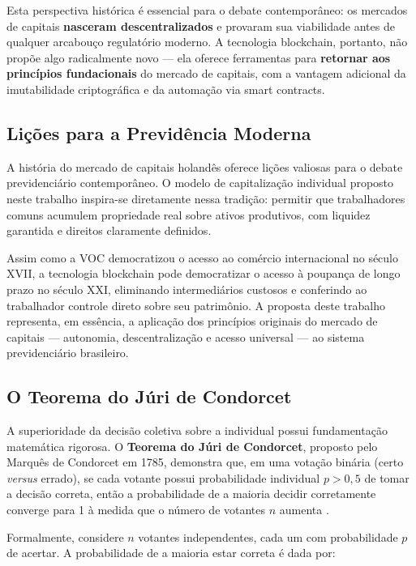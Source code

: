 Esta perspectiva histórica é essencial para o debate contemporâneo: os mercados de capitais \textbf{nasceram descentralizados} e provaram sua viabilidade antes de qualquer arcabouço regulatório moderno. A tecnologia blockchain, portanto, não propõe algo radicalmente novo --- ela oferece ferramentas para \textbf{retornar aos princípios fundacionais} do mercado de capitais, com a vantagem adicional da imutabilidade criptográfica e da automação via smart contracts.

\subsection{Lições para a Previdência Moderna}

A história do mercado de capitais holandês oferece lições valiosas para o debate previdenciário contemporâneo. O modelo de capitalização individual proposto neste trabalho inspira-se diretamente nessa tradição: permitir que trabalhadores comuns acumulem propriedade real sobre ativos produtivos, com liquidez garantida e direitos claramente definidos.

Assim como a VOC democratizou o acesso ao comércio internacional no século XVII, a tecnologia blockchain pode democratizar o acesso à poupança de longo prazo no século XXI, eliminando intermediários custosos e conferindo ao trabalhador controle direto sobre seu patrimônio. A proposta deste trabalho representa, em essência, a aplicação dos princípios originais do mercado de capitais --- autonomia, descentralização e acesso universal --- ao sistema previdenciário brasileiro.

\subsection{O Teorema do Júri de Condorcet}

A superioridade da decisão coletiva sobre a individual possui fundamentação matemática rigorosa. O \textbf{Teorema do Júri de Condorcet}, proposto pelo Marquês de Condorcet em 1785, demonstra que, em uma votação binária (certo \textit{versus} errado), se cada votante possui probabilidade individual $p > 0{,}5$ de tomar a decisão correta, então a probabilidade de a maioria decidir corretamente converge para 1 à medida que o número de votantes $n$ aumenta \cite{condorcet1785}.

Formalmente, considere $n$ votantes independentes, cada um com probabilidade $p$ de acertar. A probabilidade de a maioria estar correta é dada por:

